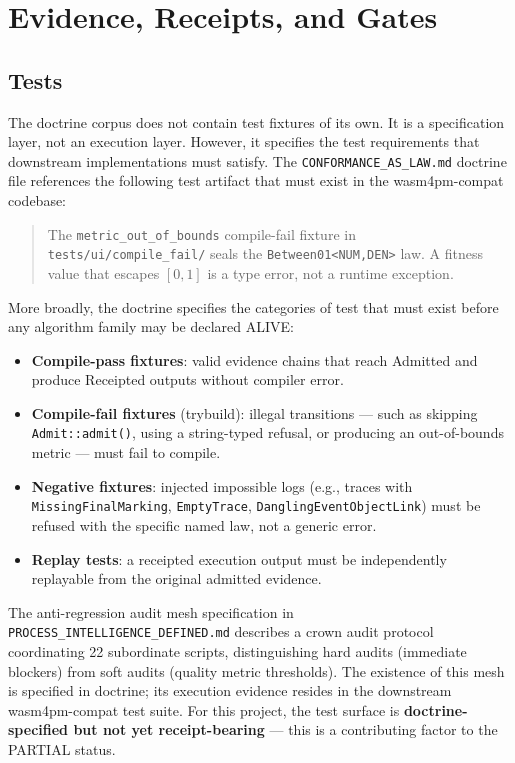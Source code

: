 \section{Evidence, Receipts, and Gates}
\label{sec:doctrine-evidence}

\subsection{Tests}
\label{sec:doctrine-evidence-tests}

The doctrine corpus does not contain test fixtures of its own. It is a specification layer,
not an execution layer. However, it specifies the test requirements that downstream
implementations must satisfy. The \texttt{CONFORMANCE\_AS\_LAW.md} doctrine file references
the following test artifact that must exist in the wasm4pm-compat codebase:

\begin{quote}
The \texttt{metric\_out\_of\_bounds} compile-fail fixture in \texttt{tests/ui/compile\_fail/}
seals the \texttt{Between01\textless{}NUM,DEN\textgreater{}} law. A fitness value that escapes
$[0,1]$ is a type error, not a runtime exception.
\end{quote}

More broadly, the doctrine specifies the categories of test that must exist before any
algorithm family may be declared ALIVE:

\begin{itemize}
  \item \textbf{Compile-pass fixtures}: valid evidence chains that reach Admitted and produce
    Receipted outputs without compiler error.
  \item \textbf{Compile-fail fixtures} (trybuild): illegal transitions --- such as skipping
    \texttt{Admit::admit()}, using a string-typed refusal, or producing an out-of-bounds
    metric --- must fail to compile.
  \item \textbf{Negative fixtures}: injected impossible logs (e.g., traces with
    \texttt{MissingFinalMarking}, \texttt{EmptyTrace}, \texttt{DanglingEventObjectLink})
    must be refused with the specific named law, not a generic error.
  \item \textbf{Replay tests}: a receipted execution output must be independently replayable
    from the original admitted evidence.
\end{itemize}

The anti-regression audit mesh specification in \texttt{PROCESS\_INTELLIGENCE\_DEFINED.md}
describes a crown audit protocol coordinating 22 subordinate scripts, distinguishing hard
audits (immediate blockers) from soft audits (quality metric thresholds). The existence of
this mesh is specified in doctrine; its execution evidence resides in the downstream
wasm4pm-compat test suite. For this project, the test surface is \textbf{doctrine-specified
but not yet receipt-bearing} --- this is a contributing factor to the PARTIAL status.

